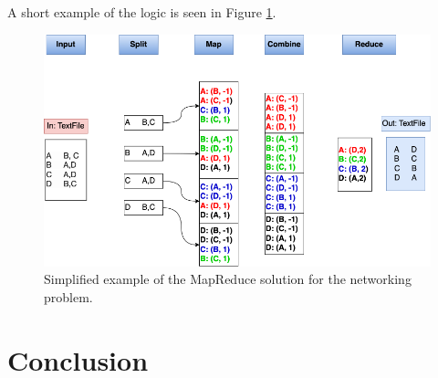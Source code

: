 \documentclass[12pt]{article}
\begin{document}
A short example of the logic is seen in Figure \ref{fig:mapreduce}.

\begin{figure}[h]
  \includegraphics[width=\linewidth]{img/mapreduce.png}
  \caption{Simplified example of the MapReduce solution for the networking problem.}
  \label{fig:mapreduce}
\end{figure}

\section{Conclusion}



\begin{thebibliography}{9}
 
\end{thebibliography}
\end{document}
